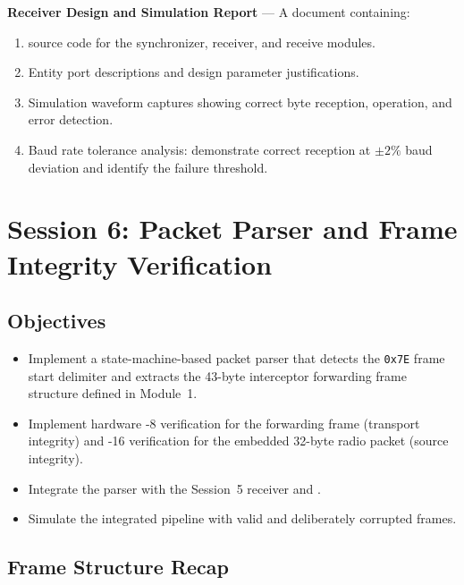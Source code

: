 \documentclass[11pt,letterpaper]{article}
\begin{document}
	\begin{tcolorbox}[deliverable={Session 5 Deliverable}]
		\textbf{\UART{} Receiver Design and Simulation Report} --- A document containing:
		\begin{enumerate}
			\item \VHDL{} source code for the synchronizer, \UART{} receiver, and receive \FIFO{} modules.
			\item Entity port descriptions and design parameter justifications.
			\item Simulation waveform captures showing correct byte reception, \FIFO{} operation, and error detection.
			\item Baud rate tolerance analysis: demonstrate correct reception at $\pm 2\%$ baud deviation and identify the failure threshold.
		\end{enumerate}
	\end{tcolorbox}

	\newpage
	\section{Session 6: Packet Parser and Frame Integrity Verification}
	\label{sec:parser}

	\subsection{Objectives}

	\begin{itemize}[leftmargin=2em]
		\item Implement a state-machine-based packet parser that detects the \texttt{0x7E} frame start delimiter and extracts the 43-byte interceptor forwarding frame structure defined in Module~1.
		\item Implement hardware \CRC{}-8 verification for the forwarding frame (transport integrity) and \CRC{}-16 verification for the embedded 32-byte radio packet (source integrity).
		\item Integrate the parser with the Session~5 \UART{} receiver and \FIFO{}.
		\item Simulate the integrated pipeline with valid and deliberately corrupted frames.
	\end{itemize}

	\subsection{Frame Structure Recap}
\end{document}
